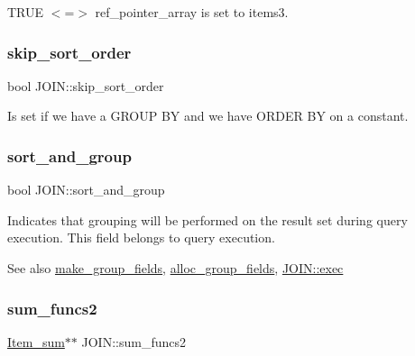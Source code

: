 T\+R\+UE $<$=$>$ ref\+\_\+pointer\+\_\+array is set to items3. \mbox{\label{classJOIN_a02bbd306d5b25097db48b42b1a70e1b1}} 
\subsubsection{\texorpdfstring{skip\+\_\+sort\+\_\+order}{skip\_sort\_order}}
{\footnotesize\ttfamily bool J\+O\+I\+N\+::skip\+\_\+sort\+\_\+order}

Is set if we have a G\+R\+O\+UP BY and we have O\+R\+D\+ER BY on a constant. \mbox{\label{classJOIN_aa89b84b461352b7f0e5d5a8784235b7d}} 
\subsubsection{\texorpdfstring{sort\+\_\+and\+\_\+group}{sort\_and\_group}}
{\footnotesize\ttfamily bool J\+O\+I\+N\+::sort\+\_\+and\+\_\+group}

Indicates that grouping will be performed on the result set during query execution. This field belongs to query execution.

\begin{DoxySeeAlso}{See also}
\mbox{\hyperlink{group__Query__Executor_gaa0bd2dbcf106da50227e2eb4932b588d}{make\+\_\+group\+\_\+fields}}, \mbox{\hyperlink{group__Query__Executor_ga108fbed43151ab58878335fbb84503c1}{alloc\+\_\+group\+\_\+fields}}, \mbox{\hyperlink{group__Query__Executor_ga31581f58624b85919d7c6cd632157929}{J\+O\+I\+N\+::exec}} 
\end{DoxySeeAlso}
\mbox{\label{classJOIN_ae436940b22d4633041116b1cde227dc0}} 
\subsubsection{\texorpdfstring{sum\+\_\+funcs2}{sum\_funcs2}}
{\footnotesize\ttfamily \mbox{\hyperlink{classItem__sum}{Item\+\_\+sum}}$\ast$$\ast$ J\+O\+I\+N\+::sum\+\_\+funcs2}

